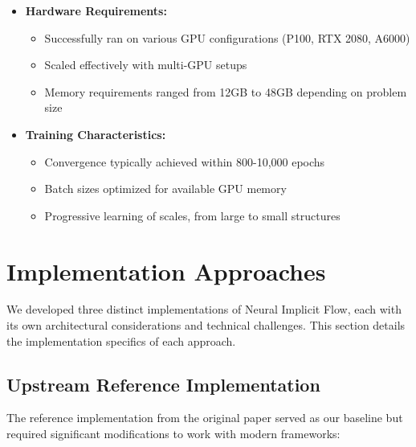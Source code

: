 \documentclass[10pt,journal,compsoc]{IEEEtran}
\begin{document}
\begin{itemize}
    \item \textbf{Hardware Requirements:}
    \begin{itemize}
        \item Successfully ran on various GPU configurations (P100, RTX 2080, A6000)
        \item Scaled effectively with multi-GPU setups
        \item Memory requirements ranged from 12GB to 48GB depending on problem size
    \end{itemize}
    
    \item \textbf{Training Characteristics:}
    \begin{itemize}
        \item Convergence typically achieved within 800-10,000 epochs
        \item Batch sizes optimized for available GPU memory
        \item Progressive learning of scales, from large to small structures
    \end{itemize}
\end{itemize}

\section{Implementation Approaches}
We developed three distinct implementations of Neural Implicit Flow, each with its own architectural considerations and technical challenges. This section details the implementation specifics of each approach.

\subsection{Upstream Reference Implementation}
The reference implementation from the original paper served as our baseline but required significant modifications to work with modern frameworks:
\end{document}
